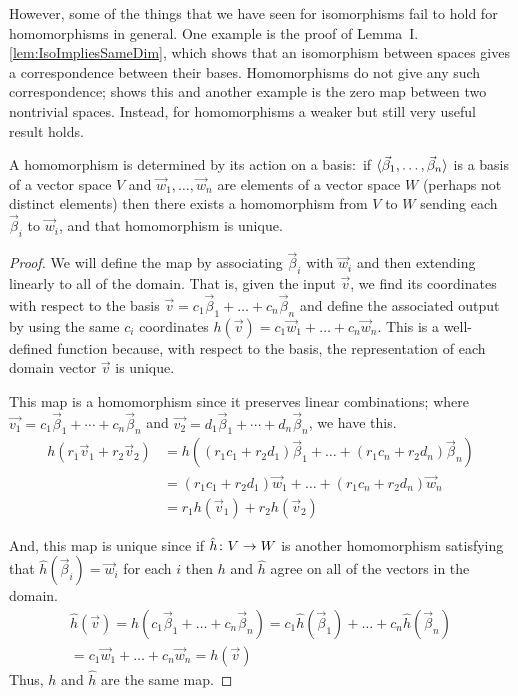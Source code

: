 However,
some of the things that we have seen for isomorphisms fail to hold for
homomorphisms in general.
One example is the proof of Lemma~I.\ref{lem:IsoImpliesSameDim}, 
which shows that an isomorphism between spaces gives 
a correspondence between their bases.
Homomorphisms do not give any such correspondence;
 shows this and another example is
the zero map between two nontrivial spaces. 
Instead, for homomorphisms a weaker but still very useful result holds.

\begin{theorem}
\label{th:HomoDetActOnBasis}
A homomorphism is determined by its action on a basis:~if
\( \langle\vec{\beta}_1,\dots,\vec{\beta}_n\rangle \)
is a basis of a vector space \( V \) and
\( \vec{w}_1,\dots,\vec{w}_n \) are elements of
a vector space \( W \)  (perhaps not distinct elements) then
there exists a homomorphism from \( V \) to \( W \) sending each
\( \vec{\beta}_i \) to \( \vec{w}_i \), and that homomorphism is unique.
\end{theorem}

\begin{proof}
We will define the map by 
associating $\vec{\beta}_i$ with $\vec{w}_i$
and then extending linearly to all of the domain.
That is, given the input $\vec{v}$, we find its coordinates with
respect to the basis
\( \vec{v}=c_1\vec{\beta}_1+\dots+c_n\vec{\beta}_n \) and define
the associated output by using the same $c_i$ coordinates
$h(\vec{v})=c_1\vec{w}_1+\dots+c_n\vec{w}_n$.
This is a well-defined function because, with respect to the basis,
the representation of each domain vector \( \vec{v} \) is unique.

This map is a homomorphism since it preserves linear combinations;
where \( \vec{v_1}=c_1\vec{\beta}_1+\cdots+c_n\vec{\beta}_n \) and
\( \vec{v_2}=d_1\vec{\beta}_1+\cdots+d_n\vec{\beta}_n \),
we have this.
\begin{align*}
  h(r_1\vec{v}_1+r_2\vec{v}_2)
  &=h((r_1c_1+r_2d_1)\vec{\beta}_1+\dots+(r_1c_n+r_2d_n)\vec{\beta}_n)  \\
  &=(r_1c_1+r_2d_1)\vec{w}_1+\dots+(r_1c_n+r_2d_n)\vec{w}_n   \\
  &=r_1h(\vec{v}_1)+r_2h(\vec{v}_2)
\end{align*}

And, this map is unique since if \( \mbox{$\hat{h}\colon V\to W$} \) 
is another homomorphism satisfying that \( \hat{h}(\vec{\beta}_i)=\vec{w}_i \) 
for each \( i \)
then \( h \) and \( \hat{h} \) agree on all of the vectors in the domain. 
\begin{multline*}
  \hat{h}(\vec{v})
  =\hat{h}(c_1\vec{\beta}_1+\dots+c_n\vec{\beta}_n)  
  =c_1\hat{h}(\vec{\beta}_1)+\dots+c_n\hat{h}(\vec{\beta}_n)  \\  
  =c_1\vec{w}_1+\dots+c_n\vec{w}_n 
  =h(\vec{v})
\end{multline*}
Thus, $h$ and $\hat{h}$ are the same map.
\end{proof}

